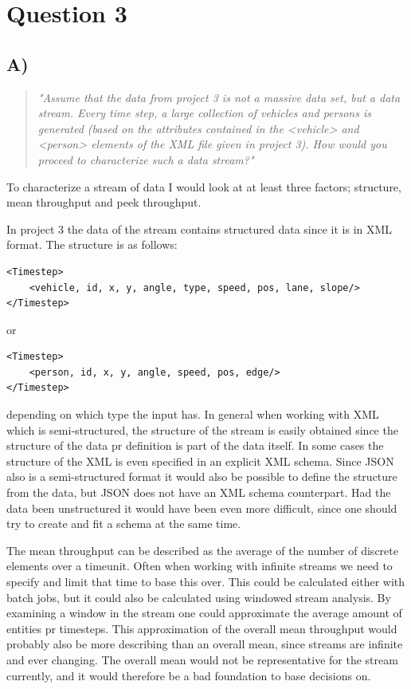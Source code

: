 \section{Question 3}

\subsection{A)}
\begin{quote}
	\textit{"Assume	that	the	data	from	project	3	is	not	a	massive	data	set,	but	a	data	stream.	Every	time	step,	a	large	collection	of	vehicles	and	persons	is	generated	(based	on	the	attributes	contained	in	the	<vehicle>	and	<person>	elements	of	the	XML	file	given	in	project	3).	How	would	you	proceed	to	characterize	such	a	data	stream?"}
\end{quote}
To characterize a stream of data I would look at at least three factors; structure, mean throughput and peek throughput. 

In project 3 the data of the stream contains structured data since it is in XML format. The structure is as follows:
\begin{verbatim}
<Timestep>
    <vehicle, id, x, y, angle, type, speed, pos, lane, slope/>
</Timestep>
\end{verbatim}
or 
\begin{verbatim}
<Timestep>
    <person, id, x, y, angle, speed, pos, edge/>
</Timestep>
\end{verbatim}
depending on which type the input has. In general when working with XML which is semi-structured, the structure of the stream is easily obtained since the structure of the data pr definition is part of the data itself. In some cases the structure of the XML is even specified in an explicit XML schema. Since JSON also is a semi-structured format it would also be possible to define the structure from the data, but JSON does not have an XML schema counterpart. Had the data been unstructured it would have been even more difficult, since one should try to create and fit a schema at the same time.

The mean throughput can be described as the average of the number of discrete elements over a timeunit. Often when working with infinite streams we need to specify and limit that time to base this over. This could be calculated either with batch jobs, but it could also be calculated using windowed stream analysis. By examining a window in the stream one could approximate the average amount of entities pr timesteps. This approximation of the overall mean throughput would probably also be more describing than an overall mean, since streams are infinite and ever changing. The overall mean would not be representative for the stream currently, and it would therefore be a bad foundation to base decisions on.

